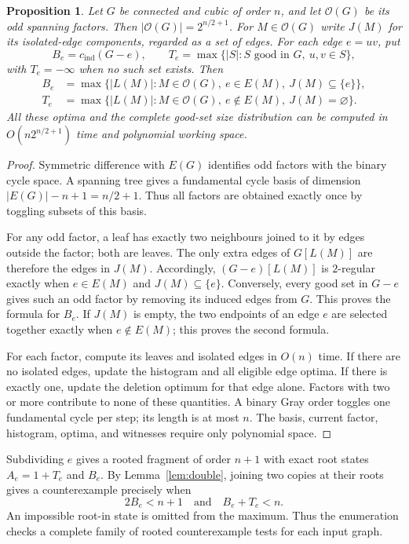 \documentclass[11pt]{article}
\newtheorem{proposition}[theorem]{Proposition}
\newcommand{\cind}{c_{\mathrm{ind}}}
\begin{document}
\begin{proposition}\label{prop:factor-enumeration}
Let $G$ be connected and cubic of order $n$, and let $\mathcal O(G)$
be its odd spanning factors. Then $|\mathcal O(G)|=2^{n/2+1}$.
For $M\in\mathcal O(G)$ write $J(M)$ for its isolated-edge components,
regarded as a set of edges. For each edge $e=uv$, put
\[
 B_e=\cind(G-e),\qquad
 T_e=\max\{|S|:S\text{ good in }G,\ u,v\in S\},
\]
with $T_e=-\infty$ when no such set exists. Then
\begin{align*}
 B_e&=\max\{|L(M)|:M\in\mathcal O(G),\ e\in E(M),\ J(M)\subseteq\{e\}\},\\
 T_e&=\max\{|L(M)|:M\in\mathcal O(G),\ e\notin E(M),\ J(M)=\varnothing\}.
\end{align*}
All these optima and the complete good-set size distribution can be
computed in $O(n2^{n/2+1})$ time and polynomial working space.
\end{proposition}
\begin{proof}
Symmetric difference with $E(G)$ identifies odd factors with the
binary cycle space. A spanning tree gives a fundamental cycle basis
of dimension $|E(G)|-n+1=n/2+1$. Thus all factors are obtained exactly
once by toggling subsets of this basis.

For any odd factor, a leaf has exactly two neighbours joined to it
by edges outside the factor; both are leaves. The only extra edges
of $G[L(M)]$ are therefore the edges in $J(M)$. Accordingly,
$(G-e)[L(M)]$ is $2$-regular exactly when $e\in E(M)$ and
$J(M)\subseteq\{e\}$. Conversely, every good set in $G-e$ gives such
an odd factor by removing its induced edges from $G$. This proves
the formula for $B_e$. If $J(M)$ is empty, the two endpoints of an
edge $e$ are selected together exactly when $e\notin E(M)$; this
proves the second formula.

For each factor, compute its leaves and isolated edges in $O(n)$
time. If there are no isolated edges, update the histogram and all
eligible edge optima. If there is exactly one, update the deletion
optimum for that edge alone. Factors with two or more contribute
to none of these quantities. A binary Gray order toggles one
fundamental cycle per step; its length is at most $n$. The basis,
current factor, histogram, optima, and witnesses require only
polynomial space.
\end{proof}

Subdividing $e$ gives a rooted fragment of order $n+1$ with exact
root states $A_e=1+T_e$ and $B_e$. By Lemma~\ref{lem:double}, joining
two copies at their roots gives a counterexample precisely when
\[
 2B_e<n+1\quad\text{and}\quad B_e+T_e<n.
\]
An impossible root-in state is omitted from the maximum.
Thus the enumeration checks a complete family of rooted
counterexample tests for each input graph.
\end{document}
